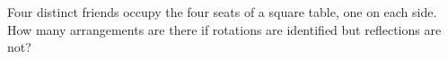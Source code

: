 Four distinct friends occupy the four seats of a square table, one on each side. How many arrangements are there if rotations are identified but reflections are not?
